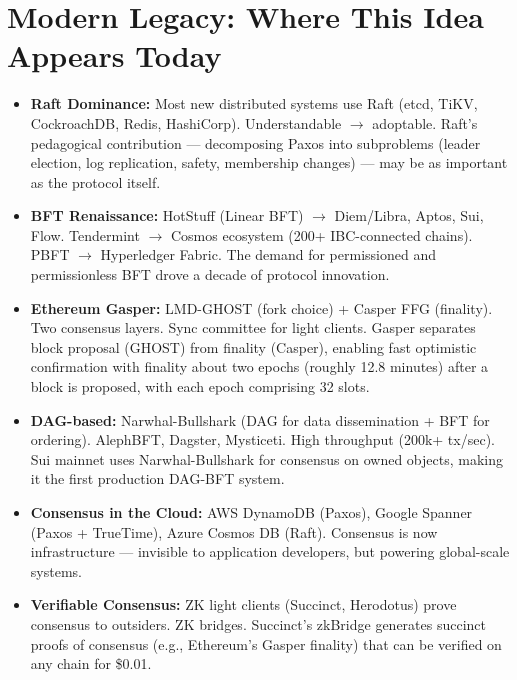 \section{Modern Legacy: Where This Idea Appears Today}
\label{sec:consensus:legacy}

\begin{itemize}
\item \textbf{Raft Dominance:} Most new distributed systems use Raft (etcd, TiKV, CockroachDB, Redis, HashiCorp). Understandable $\to$ adoptable. Raft's pedagogical contribution — decomposing Paxos into subproblems (leader election, log replication, safety, membership changes) — may be as important as the protocol itself.

\item \textbf{BFT Renaissance:} HotStuff (Linear BFT) $\to$ Diem/Libra, Aptos, Sui, Flow. Tendermint $\to$ Cosmos ecosystem (200+ IBC-connected chains). PBFT $\to$ Hyperledger Fabric. The demand for permissioned and permissionless BFT drove a decade of protocol innovation.

\item \textbf{Ethereum Gasper:} LMD-GHOST (fork choice) + Casper FFG (finality). Two consensus layers. Sync committee for light clients. Gasper separates block proposal (GHOST) from finality (Casper), enabling fast optimistic confirmation with finality about two epochs (roughly 12.8 minutes) after a block is proposed, with each epoch comprising 32 slots.

\item \textbf{DAG-based:} Narwhal-Bullshark (DAG for data dissemination + BFT for ordering). AlephBFT, Dagster, Mysticeti. High throughput (200k+ tx/sec). Sui mainnet uses Narwhal-Bullshark for consensus on owned objects, making it the first production DAG-BFT system.

\item \textbf{Consensus in the Cloud:} AWS DynamoDB (Paxos), Google Spanner (Paxos + TrueTime), Azure Cosmos DB (Raft). Consensus is now infrastructure — invisible to application developers, but powering global-scale systems.

\item \textbf{Verifiable Consensus:} ZK light clients (Succinct, Herodotus) prove consensus to outsiders. ZK bridges. Succinct's zkBridge generates succinct proofs of consensus (e.g., Ethereum's Gasper finality) that can be verified on any chain for \$0.01.


\end{itemize}
